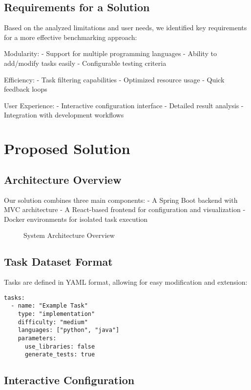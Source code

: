 \section{Requirements for a Solution}

Based on the analyzed limitations and user needs, we identified key requirements for a more effective benchmarking approach:

Modularity:
- Support for multiple programming languages
- Ability to add/modify tasks easily
- Configurable testing criteria

Efficiency:
- Task filtering capabilities
- Optimized resource usage
- Quick feedback loops

User Experience:
- Interactive configuration interface
- Detailed result analysis
- Integration with development workflows

\chapter{Proposed Solution}

\section{Architecture Overview}

Our solution combines three main components:
- A Spring Boot backend with MVC architecture
- A React-based frontend for configuration and visualization
- Docker environments for isolated task execution

\begin{figure}[h]
    \centering
    \caption{System Architecture Overview}
    \label{fig:architecture}
\end{figure}

\section{Task Dataset Format}

Tasks are defined in YAML format, allowing for easy modification and extension:

\begin{verbatim}
tasks:
  - name: "Example Task"
    type: "implementation"
    difficulty: "medium"
    languages: ["python", "java"]
    parameters:
      use_libraries: false
      generate_tests: true
\end{verbatim}

\section{Interactive Configuration}

